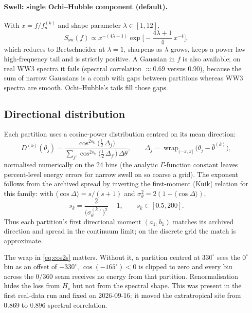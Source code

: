\documentclass[11pt,a4paper]{article}
\newcommand{\Hs}{H_s}
\begin{document}
\paragraph{Swell: single Ochi--Hubble component (default).}
With $x = f/f_p^{(k)}$ and shape parameter $\lambda\in[1,12]$,
\begin{equation}
S_{\mathrm{sw}}(f) \propto x^{-(4\lambda+1)}\exp\!\Big[-\frac{4\lambda+1}{4}\,x^{-4}\Big] ,
\end{equation}
which reduces to Bretschneider at $\lambda=1$, sharpens as $\lambda$ grows, keeps a power-law
high-frequency tail and is strictly positive. A Gaussian in $f$ is also available; on real WW3
spectra it fails (spectral correlation $\approx0.69$ versus $0.90$), because the sum of narrow
Gaussians is a comb with gaps between partitions whereas WW3 spectra are smooth. Ochi--Hubble's
tails fill those gaps.

\subsection{Directional distribution}

Each partition uses a cosine-power distribution centred on its mean direction:
\begin{equation}
D^{(k)}(\theta_j) = \frac{\cos^{2s_k}\!\big(\tfrac12\,\Delta_j\big)}
{\sum_{j'}\cos^{2s_k}\!\big(\tfrac12\,\Delta_{j'}\big)\,\Delta\theta},
\qquad
\Delta_j = \operatorname{wrap}_{(-\pi,\pi]}\big(\theta_j - \bar\theta^{(k)}\big),
\label{eq:cos2s}
\end{equation}
normalised numerically on the 24 bins (the analytic $\Gamma$-function constant leaves percent-level
energy errors for narrow swell on so coarse a grid). The exponent follows from the archived spread by
inverting the first-moment (Kuik) relation for this family: with $\langle\cos\Delta\rangle = s/(s+1)$
and $\sigma_\theta^2 = 2(1-\langle\cos\Delta\rangle)$,
\begin{equation}
s_k = \frac{2}{\big(\sigma_\theta^{(k)}\big)^2} - 1,\qquad s_k\in[0.5, 200] .
\end{equation}
Thus each partition's first directional moment $(a_1,b_1)$ matches its archived direction and
spread in the continuum limit; on the discrete grid the match is approximate.

The wrap in \eqref{eq:cos2s} matters. Without it, a partition centred at $330^\circ$ sees the
$0^\circ$ bin as an offset of $-330^\circ$, $\cos(-165^\circ)<0$ is clipped to zero and every bin
across the $0/360$ seam receives no energy from that partition. Renormalisation hides the loss from
$\Hs$ but not from the spectral shape. This was present in the first real-data run and fixed on
2026-09-16; it moved the extratropical site from 0.869 to 0.896 spectral correlation.
\end{document}
